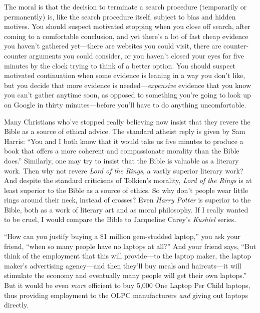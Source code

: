 {
 The moral is that the decision to terminate a search procedure
(temporarily or permanently) is, like the search procedure itself,
subject to bias and hidden motives. You should suspect motivated
stopping when you close off search, after coming to a comfortable
conclusion, and yet there's a lot of fast cheap
evidence you haven't gathered yet---there are websites
you could visit, there are counter-counter arguments you could
consider, or you haven't closed your eyes for five
minutes by the clock trying to think of a better option. You should
suspect motivated continuation when some evidence is leaning in a way
you don't like, but you decide that more evidence is
needed---\textit{expensive} evidence that you know you
can't gather anytime soon, as opposed to something
you're going to look up on Google in thirty
minutes---before you'll have to do anything
uncomfortable.}

\myendsectiontext


{
 Many Christians who've stopped really believing
now insist that they revere the Bible as a source of ethical advice.
The standard atheist reply is given by Sam Harris:
``You and I both know that it would take us five
minutes to produce a book that offers a more coherent and compassionate
morality than the Bible does.'' Similarly, one may
try to insist that the Bible is valuable as a literary work. Then why
not revere \textit{Lord of the Rings}, a vastly superior literary work?
And despite the standard criticisms of Tolkien's
morality, \textit{Lord of the Rings} is at least superior to the Bible
as a source of ethics. So why don't people wear little
rings around their neck, instead of crosses? Even \textit{Harry Potter}
is superior to the Bible, both as a work of literary art and as moral
philosophy. If I really wanted to be cruel, I would compare the Bible
to Jacqueline Carey's \textit{Kushiel} series. }

{
 ``How can you justify buying a \$1 million
gem-studded laptop,'' you ask your friend,
``when so many people have no laptops at
all?'' And your friend says, ``But
think of the employment that this will provide---to the laptop maker,
the laptop maker's advertising agency---and then
they'll buy meals and haircuts---it will stimulate the
economy and eventually many people will get their own
laptops.'' But it would be even \textit{more}
efficient to buy 5,000 One Laptop Per Child laptops, thus providing
employment to the OLPC manufacturers \textit{and} giving out laptops
directly.}

